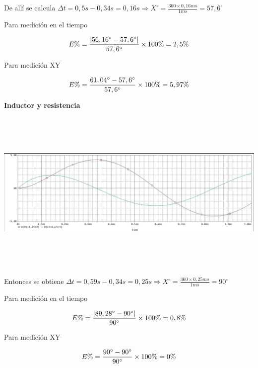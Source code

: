 \documentclass[12pt]{article}
\begin{document}
\begin{enumerate}
		\noindent De allí se calcula $\Delta t = 0,5s - 0,34s = 0,16s\Rightarrow X^\circ = \frac{360 \times 0,16ms}{1ms} = 57,6^\circ$
		
		\noindent Para medición en el tiempo
		
		\begin{equation}
			\notag E\% = \frac{|56,16^\circ - 57,6^\circ|}{57,6^\circ}\times 100\% = 2,5\%
		\end{equation}
		
		\noindent Para medición XY
		
		\begin{equation}
			\notag E\% = \frac{61,04^\circ - 57,6^\circ}{57,6^\circ}\times 100\% = 5,97\%
		\end{equation}
		
		\noindent \textbf{Inductor y resistencia}
		
		\begin{center}
			\includegraphics[width=16cm,height=8cm]{Img/spice_lvresist}
		\end{center}
		
		\noindent Entonces se obtiene $\Delta t = 0,59s - 0,34s = 0,25s\Rightarrow X^\circ = \frac{360 \times 0,25ms}{1ms} = 90^\circ$
		
		\noindent Para medición en el tiempo
		
		\begin{equation}
			\notag E\% = \frac{|89,28^\circ - 90^\circ|}{90^\circ}\times 100\% = 0,8\%
		\end{equation}
		
		\noindent Para medición XY
		
		\begin{equation}
			\notag E\% = \frac{90^\circ - 90^\circ}{90^\circ}\times 100\% = 0\%
		\end{equation}
		

\end{enumerate}
\end{document}
